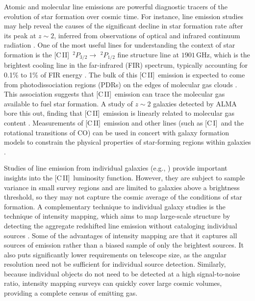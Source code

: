 \documentclass[fleqn,usenatbib]{mnras}
\newcommand{\cii}{[C{\sc\,II}]}
\newcommand{\ci}{[C{\sc\,I}]}
\begin{document}
Atomic and molecular line emissions are powerful diagnostic tracers of the evolution of star formation over cosmic time. For instance, line emission studies may help reveal the causes of the significant decline in star formation rate after its peak at $z {\sim} 2$, inferred from observations of optical and infrared continuum radiation \citep{Madau2014}. One of the most useful lines for understanding the context of star formation is the \cii\ $^2P_{3/2}\rightarrow$ $^2P_{1/2}$ fine structure line at $1901$\,GHz, which is the brightest cooling line in the far-infrared (FIR) spectrum, typically accounting for 0.1$\%$ to 1$\%$ of FIR energy \citep{1991ApJ...373..423S, malhotra1997infrared, diaz-santos:2017}. The bulk of this \cii\ emission is expected to come from photodissociation regions (PDRs) on the edges of molecular gas clouds \citep{2010ApJ...724..957S}. This association suggests that \cii\ emission can trace the molecular gas available to fuel star formation. A study of $z\sim2$ galaxies detected by ALMA bore this out, finding that \cii\ emission is linearly related to molecular gas content \citep{2018MNRAS.481.1976Z}. Measurements of \cii\ emission and other lines (such as \ci\ and the rotational transitions of CO) can be used in concert with galaxy formation models to constrain the physical properties of star-forming regions within galaxies \citep{2019MNRAS.482.4906P, 2021ApJ...911..132Y}. 

Studies of line emission from individual galaxies (e.g., \citet{2013ARA&A..51..105C, 2017ApJ...834...36H, 2018MNRAS.481.1976Z}) provide important insights into the \cii\ luminosity function. However, they are subject to sample variance in small survey regions and are limited to galaxies above a brightness threshold, so they may not capture the cosmic average of the conditions of star formation. A complementary technique to individual galaxy studies is the technique of intensity mapping, which aims to map large-scale structure by detecting the aggregate redshifted line emission without cataloging individual sources \citep{1979MNRAS.188..791H, 1990MNRAS.247..510S, 1997ApJ...475..429M, 1999ApJ...512..547S, 2008MNRAS.383.1195W, 2008PhRvL.100i1303C, 2011JCAP...08..010V, kovetz2017line, 2019BAAS...51c.101K}. Some of the advantages of intensity mapping are that it captures all sources of emission rather than a biased sample of only the brightest sources. It also puts significantly lower requirements on telescope size, as the angular resolution need not be sufficient for individual source detection. Similarly, because individual objects do not need to be detected at a high signal-to-noise ratio, intensity mapping surveys can quickly cover large cosmic volumes, providing a complete census of emitting gas.
\end{document}
